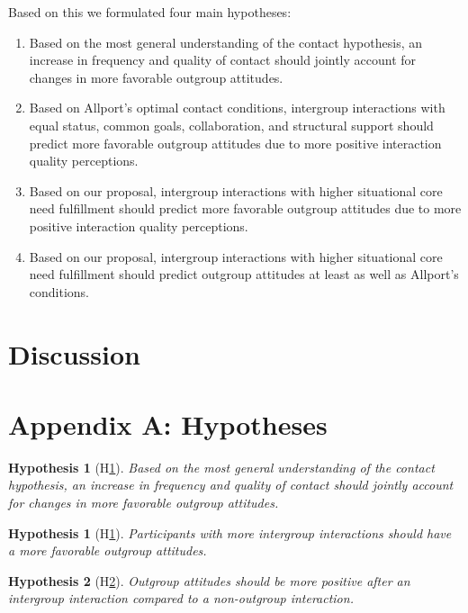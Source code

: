 \documentclass[man, 12pt, a4paper]{apa7}
\theoremstyle{break}
\theoremstyle{plain}
\newtheorem{hyp}{Hypothesis}
\newtheorem{subhyp}{Hypothesis}
\begin{document}
Based on this we formulated four main hypotheses:
\begin{enumerate}
    \item Based on the most general understanding of the contact hypothesis, an increase in frequency and quality of contact should jointly account for changes in more favorable outgroup attitudes.
    \item Based on Allport’s optimal contact conditions, intergroup interactions with equal status, common goals, collaboration, and structural support should predict more favorable outgroup attitudes due to more positive interaction quality perceptions.
    \item Based on our proposal, intergroup interactions with higher situational core need fulfillment should predict more favorable outgroup attitudes due to more positive interaction quality perceptions.
    \item Based on our proposal, intergroup interactions with higher situational core need fulfillment should predict outgroup attitudes at least as well as Allport’s conditions.
\end{enumerate}



\section{Discussion}

\printbibliography

\appendix

\section{Appendix A: Hypotheses}
\label{app:AppendixA}

\begin{hyp}[H\ref{hyp:contact}] \label{hyp:contact}
Based on the most general understanding of the contact hypothesis, an increase in frequency and quality of contact should jointly account for changes in more favorable outgroup attitudes.
\end{hyp}

\begin{subhyp}[H\ref{hyp:contactFreq}] \label{hyp:contactFreq}
\addtolength{\leftskip}{2.5em}
Participants with more intergroup interactions should have a more favorable outgroup attitudes.
\end{subhyp}

\begin{subhyp}[H\ref{hyp:contactDummy}] \label{hyp:contactDummy}
\addtolength{\leftskip}{2.5em}
Outgroup attitudes should be more positive after an intergroup interaction compared to a non-outgroup interaction.
\end{subhyp}
\end{document}
